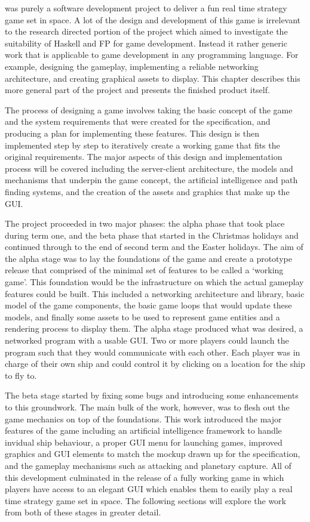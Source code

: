 
 was purely a software development project to deliver a fun real time strategy game set in space. A lot of the design and development of this game is irrelevant to the research directed portion of the project which aimed to investigate the suitability of Haskell and FP for game development. Instead it rather generic work that is applicable to game development in any programming language. For example, designing the gameplay, implementing a reliable networking architecture, and creating graphical assets to display. This chapter describes this more general part of the project and presents the finished product itself.

The process of designing a game involves taking the basic concept of the game and the system requirements that were created for the specification, and producing a plan for implementing these features. This design is then implemented step by step to iteratively create a working game that fits the original requirements. The major aspects of this design and implementation process will be covered including the server-client architecture, the models and mechanisms that underpin the game concept, the artificial intelligence and path finding systems, and the creation of the assets and graphics that make up the GUI.

The project proceeded in two major phases: the alpha phase that took place during term one, and the beta phase that started in the Christmas holidays and continued through to the end of second term and the Easter holidays. The aim of the alpha stage was to lay the foundations of the game and create a prototype release that comprised of the minimal set of features to be called a `working game'. This foundation would be the infrastructure on which the actual gameplay features could be built. This included a networking architecture and library, basic model of the game components, the basic game loops that would update these models, and finally some assets to be used to represent game entities and a rendering process to display them. The alpha stage produced what was desired, a networked program with a usable GUI. Two or more players could launch the program such that they would communicate with each other. Each player was in charge of their own ship and could control it by clicking on a location for the ship to fly to.

The beta stage started by fixing some bugs and introducing some enhancements to this groundwork. The main bulk of the work, however, was to flesh out the game mechanics on top of the foundations. This work introduced the major features of the game including an artificial intelligence framework to handle invidual ship behaviour, a proper GUI menu for launching games, improved graphics and GUI elements to match the mockup drawn up for the specification, and the gameplay mechanisms such as attacking and planetary capture. All of this development culminated in the release of a fully working game in which players have access to an elegant GUI which enables them to easily play a real time strategy game set in space. The following sections will explore the work from both of these stages in greater detail.


